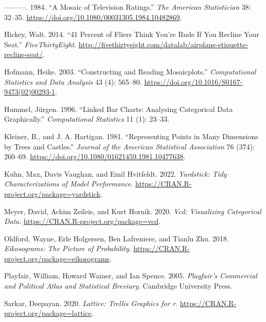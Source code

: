 \begin{CSLReferences}{1}{0}
\leavevmode{}%
---------. 1984. {``A Mosaic of Television Ratings.''} \emph{The American Statistician} 38: 32--35. \url{https://doi.org/10.1080/00031305.1984.10482869}.

\leavevmode{}%
Hickey, Walt. 2014. {``41 Percent of Fliers Think You're Rude If You Recline Your Seat.''} \emph{FiveThirtyEight}. \url{http://fivethirtyeight.com/datalab/airplane-etiquette-recline-seat/}.

\leavevmode{}%
Hofmann, Heike. 2003. {``Constructing and Reading Mosaicplots.''} \emph{Computational Statistics and Data Analysis} 43 (4): 565--80. \url{https://doi.org/10.1016/S0167-9473(02)00293-1}.

\leavevmode{}%
Hummel, Jürgen. 1996. {``Linked Bar Charts: Analysing Categorical Data Graphically.''} \emph{Computational Statistics} 11 (1): 23--33.

\leavevmode{}%
Kleiner, B., and J. A. Hartigan. 1981. {``Representing Points in Many Dimensions by Trees and Castles.''} \emph{Journal of the American Statistical Association} 76 (374): 260--69. \url{https://doi.org/10.1080/01621459.1981.10477638}.

\leavevmode{}%
Kuhn, Max, Davis Vaughan, and Emil Hvitfeldt. 2022. \emph{Yardstick: Tidy Characterizations of Model Performance}. \url{https://CRAN.R-project.org/package=yardstick}.

\leavevmode{}%
Meyer, David, Achim Zeileis, and Kurt Hornik. 2020. \emph{Vcd: Visualizing Categorical Data}. \url{https://CRAN.R-project.org/package=vcd}.

\leavevmode{}%
Oldford, Wayne, Erle Holgersen, Ben Lafreniere, and Tianlu Zhu. 2018. \emph{Eikosograms: The Picture of Probability}. \url{https://CRAN.R-project.org/package=eikosograms}.

\leavevmode{}%
Playfair, William, Howard Wainer, and Ian Spence. 2005. \emph{Playfair's Commercial and Political Atlas and Statistical Breviary}. Cambridge University Press.

\leavevmode{}%
Sarkar, Deepayan. 2020. \emph{Lattice: Trellis Graphics for r}. \url{https://CRAN.R-project.org/package=lattice}.


\end{CSLReferences}
